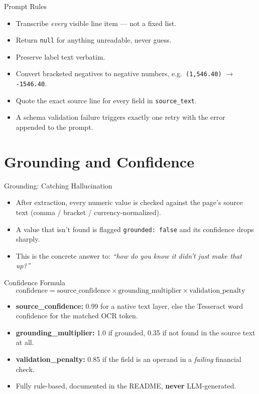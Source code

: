 \documentclass[11pt]{beamer}
\begin{document}
\begin{frame}{Prompt Rules}
  \begin{itemize}
    \item Transcribe \emph{every} visible line item --- not a fixed list.
    \item Return \texttt{null} for anything unreadable, never guess.
    \item Preserve label text verbatim.
    \item Convert bracketed negatives to negative numbers, e.g.\
      \texttt{(1,546.40)} $\rightarrow$ \texttt{-1546.40}.
    \item Quote the exact source line for every field in \texttt{source\_text}.
    \item A schema validation failure triggers exactly one retry with the error
      appended to the prompt.
  \end{itemize}
\end{frame}

\section{Grounding and Confidence}
\begin{frame}{Grounding: Catching Hallucination}
  \begin{itemize}
    \item After extraction, every numeric value is checked against the page's source
      text (comma / bracket / currency-normalized).
    \item A value that isn't found is flagged \texttt{grounded: false} and its
      confidence drops sharply.
    \item This is the concrete answer to: \emph{``how do you know it didn't just
      make that up?''}
  \end{itemize}
\end{frame}

\begin{frame}{Confidence Formula}
  \[
    \text{confidence} = \text{source\_confidence} \times \text{grounding\_multiplier}
    \times \text{validation\_penalty}
  \]
  \begin{itemize}
    \item \textbf{source\_confidence:} 0.99 for a native text layer, else the
      Tesseract word confidence for the matched OCR token.
    \item \textbf{grounding\_multiplier:} 1.0 if grounded, 0.35 if not found in the
      source text at all.
    \item \textbf{validation\_penalty:} 0.85 if the field is an operand in a
      \emph{failing} financial check.
    \item Fully rule-based, documented in the README, \textbf{never} LLM-generated.
  \end{itemize}
\end{frame}
\end{document}
